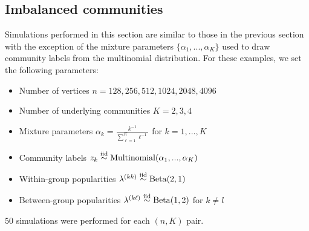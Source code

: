 \documentclass[12pt]{article}
\providecommand{\tightlist}{%
  \setlength{\itemsep}{0pt}\setlength{\parskip}{0pt}}
\begin{document}
\hypertarget{imbalanced-communities}{%
\subsection{Imbalanced communities}\label{imbalanced-communities}}

Simulations performed in this section are similar to those in the
previous section with the exception of the mixture parameters
\(\{\alpha_1, ..., \alpha_K\}\) used to draw community labels from the
multinomial distribution. For these examples, we set the following
parameters:

\begin{itemize}
\tightlist
\item
  Number of vertices \(n = 128, 256, 512, 1024, 2048, 4096\)
\item
  Number of underlying communities \(K = 2, 3, 4\)
\item
  Mixture parameters \(\alpha_k = \frac{k^{-1}}{\sum_{\ell=1}^K \ell^{-1}}\)
  for \(k = 1, ..., K\)
\item
  Community labels
  \(z_k \stackrel{\text{iid}}{\sim} \mathrm{Multinomial}(\alpha_1, ..., \alpha_K)\)
\item
  Within-group popularities
  \(\lambda^{(kk)} \stackrel{\text{iid}}{\sim} \mathrm{Beta}(2, 1)\)
\item
  Between-group popularities
  \(\lambda^{(k \ell)} \stackrel{\text{iid}}{\sim} \mathrm{Beta}(1, 2)\) for
  \(k \neq l\)
\end{itemize}

\(50\) simulations were performed for each \((n, K)\) pair.

\end{document}
